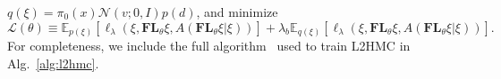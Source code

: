 \documentclass[main.tex]{subfiles}
\begin{document}
$q(\xi) = \pi_0(x) \mathcal{N}(v; 0, I) p(d)$, and minimize
%
\begin{equation}
    \mathcal{L}(\theta)\equiv \mathbb{E}_{p(\xi)}\left[\ell_{\lambda}(\xi,
    \mathbf{FL}_{\theta}\xi, A(\mathbf{FL}_{\theta}\xi|\xi))\right] + \lambda_b
    \mathbb{E}_{q(\xi)}\left[\ell_{\lambda}(\xi, \mathbf{FL}_{\theta}\xi,
    A(\mathbf{FL}_{\theta} \xi| \xi))\right].
    \label{eq:loss_L}
\end{equation}
%
For completeness, we include the full algorithm~\cite{2017arXiv171109268L} used to train L2HMC in Alg.~\ref{alg:l2hmc}.
%
\end{document}
